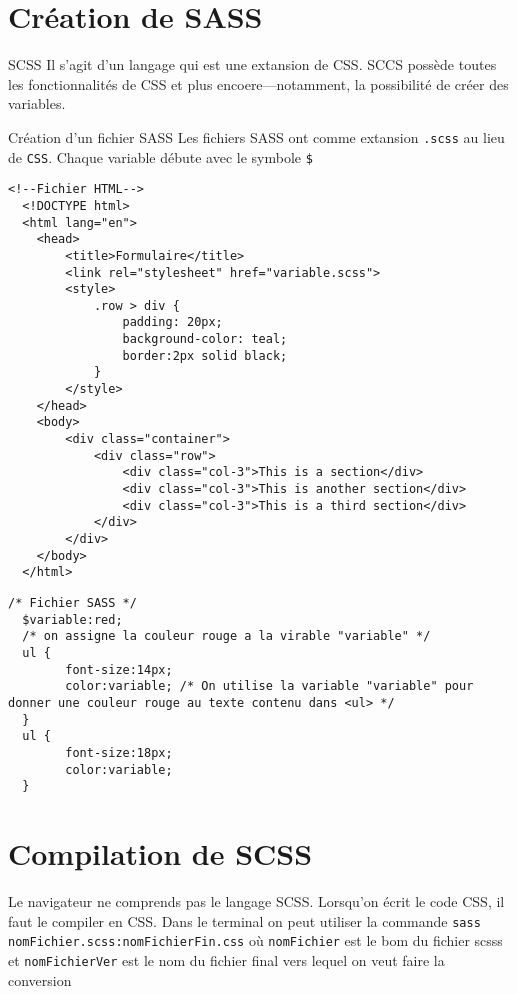 \documentclass{report}
\begin{document}
\section{Création de SASS}
\begin{DefG}{SCSS}{}
	Il s'agit d'un langage qui est une extansion de CSS. SCCS possède toutes les fonctionnalités de CSS et plus encoere—notamment, la possibilité de créer des variables.
\end{DefG}


\begin{Syntaxe*}{Création d'un fichier SASS}{}
Les fichiers SASS ont comme extansion \texttt{\footnotesize{.scss}} au lieu de \texttt{\footnotesize{CSS}}.  
Chaque variable débute avec le symbole \texttt{\footnotesize{\$}}
\end{Syntaxe*}

 


\begin{ExampleDdHTML*}{}{}
  \begin{lstlisting}[style=HTMLDraculaDark] 
  <!--Fichier HTML-->
  <!DOCTYPE html>
  <html lang="en">
	<head>
		<title>Formulaire</title>
		<link rel="stylesheet" href="variable.scss">	
		<style>
			.row > div {
				padding: 20px;
				background-color: teal;
				border:2px solid black;
			}
		</style>
	</head>
	<body>
		<div class="container">
			<div class="row">
				<div class="col-3">This is a section</div>
				<div class="col-3">This is another section</div>
				<div class="col-3">This is a third section</div>
			</div>
		</div>
	</body>
  </html>
\end{lstlisting}

\begin{lstlisting}[style=CSSDraculaDark] 
  /* Fichier SASS */
  $variable:red; 
  /* on assigne la couleur rouge a la virable "variable" */ 	
  ul {
		font-size:14px;
		color:variable;	/* On utilise la variable "variable" pour donner une couleur rouge au texte contenu dans <ul> */ 
  }
  ul {
		font-size:18px;
		color:variable;
  }
  \end{lstlisting}
\end{ExampleDdHTML*}


\section{Compilation de SCSS}
\noindent 
Le navigateur ne comprends pas le langage SCSS. Lorsqu'on écrit le code CSS, il faut le compiler en CSS. Dans le
terminal on peut utiliser la commande \texttt{\footnotesize{sass nomFichier.scss:nomFichierFin.css}} où 
\texttt{\footnotesize{nomFichier}} est le bom du fichier scsss et 
\texttt{\footnotesize{nomFichierVer}} est le nom du fichier final vers lequel on veut faire la conversion 
\end{document}
